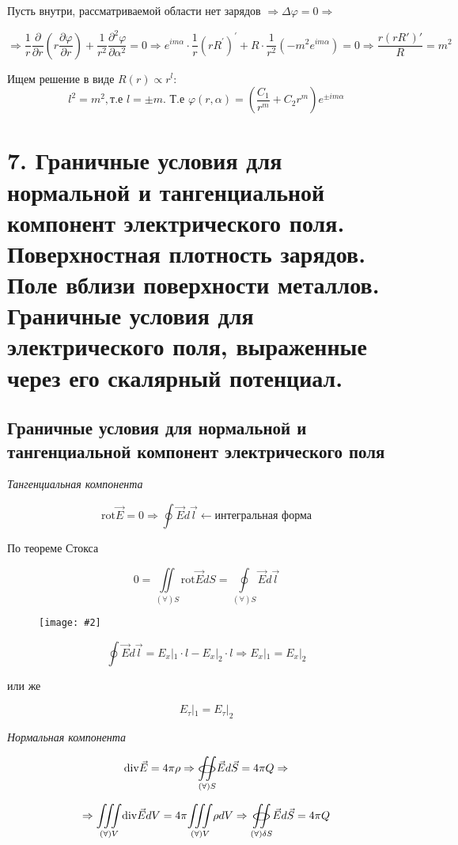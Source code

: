 \documentclass[a4paper,12pt]{article}
\newcommand{\kr}[1]{\textit{#1}}
\newcommand{\fc}[1]{\[#1\]}
\newcommand{\mm}[1]{\mathrm{#1}}
\newcommand{\oiint}{%
  \mathchoice%
    {\mathop{\raisebox{0.1ex}{\scalebox{1.7}[0.7]{\(\bigcirc\)}}}%
     \!\!\!\!\!\!\!\!\!\!\!\int\!\!\!\int}%
    {\mathop{\raisebox{0.2ex}{\scalebox{1.}[0.6]{\(\bigcirc\)}}}%
     \!\!\!\!\!\!\!\int\!\!\!\int}%
    {\mathop{\raisebox{0.1ex}{\scalebox{1}[0.8]{\(\bigcirc\)}}}%
     \!\!\!\!\!\!\!\!\!\int\!\!\!\int}%
    {\mathop{\raisebox{0.05ex}{\scalebox{0.8}[0.8]{\(\bigcirc\)}}}%
     \!\!\!\!\!\!\!\!\int\!\!\!\int}%
}
\newcommand{\imc}[2][0.7\textwidth]{%
    \begin{figure}[h!]
        \centering
        \texttt{[image: \#2]}
    \end{figure}%
}
\begin{document}
Пусть внутри, рассматриваемой области нет зарядов $\Rightarrow \Delta \varphi=0 \Rightarrow$

\fc{\Rightarrow \frac{1}{r} \frac{\partial}{\partial r}\left(r \frac{\partial \varphi}{\partial r}\right)+\frac{1}{r^2} \frac{\partial^2 \varphi}{\partial \alpha^2}=0 \Rightarrow e^{i m \alpha} \cdot \frac{1}{r}\left(r R^{\prime}\right)^{\prime}+R \cdot \frac{1}{r^2}\left(-m^2 e^{i m \alpha}\right)=0 \Rightarrow \frac{r(rR')'}{R}=m^2}

Ищем решение в виде $R(r)\varpropto r^l$:
\fc{l^2=m^2 ,\text{т.е }l=\pm m \text{. Т.е } \varphi(r,\alpha)=\left(\frac{C_1}{r^m}+C_2r^m\right)e^{\pm im\alpha}}

\section*{7. Граничные условия для нормальной и тангенциальной компонент
электрического поля. Поверхностная плотность зарядов. Поле вблизи
поверхности металлов. Граничные условия для электрического поля,
выраженные через его скалярный потенциал.}

\subsection*{Граничные условия для нормальной и тангенциальной компонент
электрического поля}

\kr{Тангенциальная компонента}

\fc{\mm{rot}\vec{E}=0 \Rightarrow \oint \vec{E}d\vec{l}\leftarrow \text{интегральная форма}}

По теореме Стокса

\fc{0=\underset{(\forall )S}{\iint} \mm{rot}\vec{E}dS=\underset{(\forall )S}{\oint }\vec{E}d\vec{l}}

\imc[0.826\textwidth]{10.png} 

\newpage


\fc{\oint \vec{E}d\vec{l}=E_x|_1\cdot l-E_x|_2\cdot l\Rightarrow E_x|_1=E_x|_2}

или же 

\fc{E_\tau|_1=E_\tau|_2}

\kr{Нормальная компонента}

\fc{\mm{div}\vec{E}=4\pi \rho \Rightarrow \underset{(\forall)S}{\oiint}\vec{E}d\vec{S}=4\pi Q \Rightarrow}

\fc{\Rightarrow \underset{(\forall)V}{\iiint} \mm{div}\vec{E}dV=4\pi \underset{(\forall)V}{\iiint} \rho dV \Rightarrow \underset{(\forall)\delta S}{\oiint}\vec{E}d\vec{S}=4\pi Q }
\end{document}

